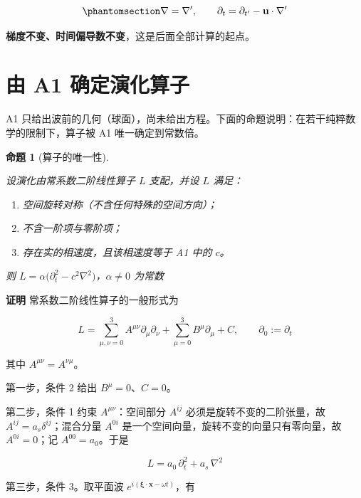 \documentclass[
  chinese,
  a4paper,
  UTF8,
  12pt,
  oneside,
  openany]{ctexbook}
\providecommand{\tightlist}{%
  \setlength{\itemsep}{0pt}\setlength{\parskip}{0pt}}
\theoremstyle{plain}
\theoremstyle{plain}
\theoremstyle{plain}
\newtheorem{proposition}{命题}[chapter]
\theoremstyle{definition}
\theoremstyle{plain}
\theoremstyle{plain}
\theoremstyle{remark}
\begin{document}
\begin{equation}\protect\phantomsection\label{eq-derivative-inverse}{
\nabla=\nabla',\qquad \partial_{t}=\partial_{t'}-\mathbf{u}\cdot\nabla'
}\end{equation}

\textbf{梯度不变、时间偏导数不变}，这是后面全部计算的起点。

\section{由 A1 确定演化算子}\label{sec-tsf-operator}

A1
只给出波前的几何（球面），尚未给出方程。下面的命题说明：在若干纯粹数学的限制下，算子被
A1 唯一确定到常数倍。

\begin{proposition}[算子的唯一性]\protect\hypertarget{prp-operator-unique}{}\label{prp-operator-unique}

设演化由常系数二阶线性算子 \(L\) 支配，并设 \(L\) 满足：

\begin{enumerate}
\def\labelenumi{\arabic{enumi}.}
\tightlist
\item
  空间旋转对称（不含任何特殊的空间方向）；
\item
  不含一阶项与零阶项；
\item
  存在实的相速度，且该相速度等于 A1 中的 \(c\)。
\end{enumerate}

则
\(L=\alpha\bigl(\partial_{t}^{2}-c^{2}\nabla^{2}\bigr)\)，\(\alpha\neq0\)
为常数

\end{proposition}

\textbf{证明} 常系数二阶线性算子的一般形式为

\[
L=\sum_{\mu,\nu=0}^{3}A^{\mu\nu}\partial_{\mu}\partial_{\nu}
+\sum_{\mu=0}^{3}B^{\mu}\partial_{\mu}+C,\qquad \partial_{0}:=\partial_{t}
\]

其中 \(A^{\mu\nu}=A^{\nu\mu}\)。

第一步，条件 2 给出 \(B^{\mu}=0\)、\(C=0\)。

第二步，条件 1 约束 \(A^{\mu\nu}\)：空间部分 \(A^{ij}\)
必须是旋转不变的二阶张量，故 \(A^{ij}=a_{s}\delta^{ij}\)；混合分量
\(A^{0i}\) 是一个空间向量，旋转不变的向量只有零向量，故 \(A^{0i}=0\)；记
\(A^{00}=a_{0}\)。于是

\[
L=a_{0}\,\partial_{t}^{2}+a_{s}\,\nabla^{2}
\]

第三步，条件 3。取平面波
\(e^{i(\boldsymbol{\xi}\cdot\mathbf{x}-\omega t)}\)，有
\end{document}
